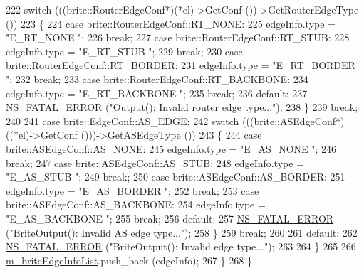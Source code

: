 \begin{DoxyCode}
222           \textcolor{keywordflow}{switch} (((brite::RouterEdgeConf*)(*el)->GetConf ())->GetRouterEdgeType ())
223             \{
224             \textcolor{keywordflow}{case} brite::RouterEdgeConf::RT\_NONE:
225               edgeInfo.type = \textcolor{stringliteral}{"E\_RT\_NONE "};
226               \textcolor{keywordflow}{break};
227             \textcolor{keywordflow}{case} brite::RouterEdgeConf::RT\_STUB:
228               edgeInfo.type = \textcolor{stringliteral}{"E\_RT\_STUB "};
229               \textcolor{keywordflow}{break};
230             \textcolor{keywordflow}{case} brite::RouterEdgeConf::RT\_BORDER:
231               edgeInfo.type = \textcolor{stringliteral}{"E\_RT\_BORDER "};
232               \textcolor{keywordflow}{break};
233             \textcolor{keywordflow}{case} brite::RouterEdgeConf::RT\_BACKBONE:
234               edgeInfo.type = \textcolor{stringliteral}{"E\_RT\_BACKBONE "};
235               \textcolor{keywordflow}{break};
236             \textcolor{keywordflow}{default}:
237               \hyperlink{group__fatal_ga5131d5e3f75d7d4cbfd706ac456fdc85}{NS\_FATAL\_ERROR} (\textcolor{stringliteral}{"Output(): Invalid router edge type..."});
238             \}
239           \textcolor{keywordflow}{break};
240 
241         \textcolor{keywordflow}{case} brite::EdgeConf::AS\_EDGE:
242           \textcolor{keywordflow}{switch} (((brite::ASEdgeConf*)((*el)->GetConf ()))->GetASEdgeType ())
243             \{
244             \textcolor{keywordflow}{case} brite::ASEdgeConf::AS\_NONE:
245               edgeInfo.type = \textcolor{stringliteral}{"E\_AS\_NONE "};
246               \textcolor{keywordflow}{break};
247             \textcolor{keywordflow}{case} brite::ASEdgeConf::AS\_STUB:
248               edgeInfo.type = \textcolor{stringliteral}{"E\_AS\_STUB "};
249               \textcolor{keywordflow}{break};
250             \textcolor{keywordflow}{case} brite::ASEdgeConf::AS\_BORDER:
251               edgeInfo.type = \textcolor{stringliteral}{"E\_AS\_BORDER "};
252               \textcolor{keywordflow}{break};
253             \textcolor{keywordflow}{case} brite::ASEdgeConf::AS\_BACKBONE:
254               edgeInfo.type = \textcolor{stringliteral}{"E\_AS\_BACKBONE "};
255               \textcolor{keywordflow}{break};
256             \textcolor{keywordflow}{default}:
257               \hyperlink{group__fatal_ga5131d5e3f75d7d4cbfd706ac456fdc85}{NS\_FATAL\_ERROR} (\textcolor{stringliteral}{"BriteOutput(): Invalid AS edge type..."});
258             \}
259           \textcolor{keywordflow}{break};
260 
261         \textcolor{keywordflow}{default}:
262           \hyperlink{group__fatal_ga5131d5e3f75d7d4cbfd706ac456fdc85}{NS\_FATAL\_ERROR} (\textcolor{stringliteral}{"BriteOutput(): Invalid edge type..."});
263 
264         \}
265 
266       \hyperlink{classns3_1_1BriteTopologyHelper_a04162f6e488c14c715879c4fc495a88a}{m\_briteEdgeInfoList}.push\_back (edgeInfo);
267     \}
268 \}
\end{DoxyCode}


